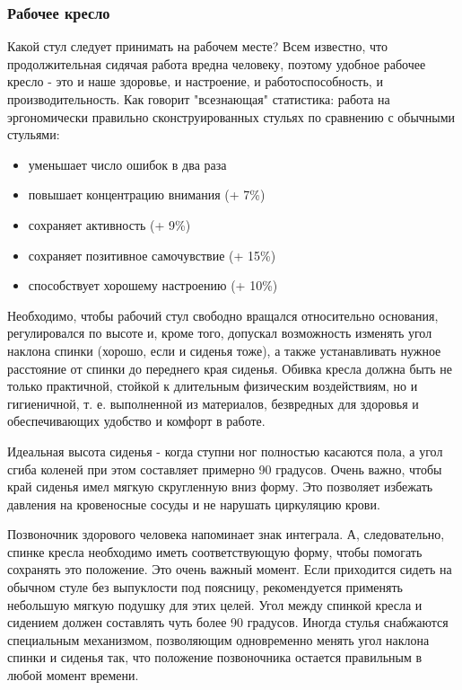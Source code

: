 \documentclass[russian,utf8,emptystyle]{eskdtext}
\begin{document}
\begin{spacing}{1.5}
\subsubsection{Рабочее кресло}

Какой стул следует принимать на рабочем месте? Всем известно, что продолжительная сидячая работа вредна человеку, поэтому удобное рабочее кресло - это и наше здоровье, и настроение, и работоспособность, и производительность. Как говорит "всезнающая" статистика: работа на эргономически правильно сконструированных стульях по сравнению с обычными стульями:
\begin{itemize}
\item уменьшает число ошибок в два раза
\item повышает концентрацию внимания (+ 7\%)
\item сохраняет активность (+ 9\%)
\item сохраняет позитивное самочувствие (+ 15\%)
\item способствует хорошему настроению (+ 10\%)
\end{itemize}

Необходимо, чтобы рабочий стул свободно вращался относительно основания, регулировался по высоте и, кроме того, допускал возможность изменять угол наклона спинки (хорошо, если и сиденья тоже), а также устанавливать нужное расстояние от спинки до переднего края сиденья. Обивка кресла должна быть не только практичной, стойкой к длительным физическим воздействиям, но и гигиеничной, т. е. выполненной из материалов, безвредных для здоровья и обеспечивающих удобство и комфорт в работе.

Идеальная высота сиденья - когда ступни ног полностью касаются пола, а угол сгиба коленей при этом составляет примерно 90 градусов. Очень важно, чтобы край сиденья имел мягкую скругленную вниз форму. Это позволяет избежать давления на кровеносные сосуды и не нарушать циркуляцию крови.

Позвоночник здорового человека напоминает знак интеграла. А, следовательно, спинке кресла необходимо иметь соответствующую форму, чтобы помогать сохранять это положение. Это очень важный момент. Если приходится сидеть на обычном стуле без выпуклости под поясницу, рекомендуется применять небольшую мягкую подушку для этих целей. Угол между спинкой кресла и сидением должен составлять чуть более 90 градусов. Иногда стулья снабжаются специальным механизмом, позволяющим одновременно менять угол наклона спинки и сиденья так, что положение позвоночника остается правильным в любой момент времени.


\end{spacing}
\end{document}
